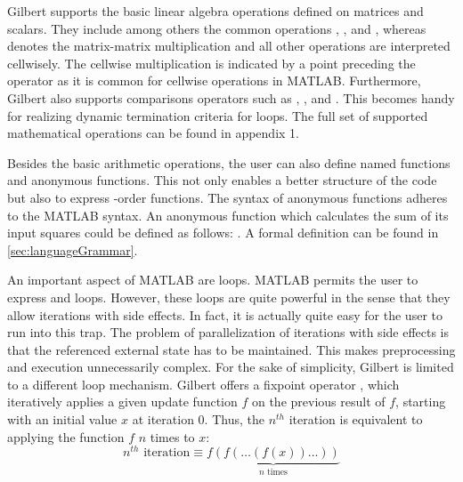Gilbert supports the basic linear algebra operations defined on matrices and scalars.
They include among others the common operations \code{+}, \code{-}, \code{/} and \code{*}, whereas \code{*} denotes the matrix-matrix multiplication and all other operations are interpreted cellwisely.
The cellwise multiplication is indicated by a point preceding the operator as it is common for cellwise operations in MATLAB.
Furthermore, Gilbert also supports comparisons operators such as \code{>}, \code{>=}, \code{==} and \code{\textasciitilde=}.
This becomes handy for realizing dynamic termination criteria for loops.
The full set of supported mathematical operations can be found in appendix 1.

Besides the basic arithmetic operations, the user can also define named functions and anonymous functions.
This not only enables a better structure of the code but also to express -order functions.
The syntax of anonymous functions adheres to the MATLAB syntax.
An anonymous function which calculates the sum of its input squares could be defined as follows: .
A formal definition can be found in \cref{sec:languageGrammar}.

An important aspect of MATLAB are loops.
MATLAB permits the user to express  and  loops.
However, these loops are quite powerful in the sense that they allow iterations with side effects.
In fact, it is actually quite easy for the user to run into this trap.
The problem of parallelization of iterations with side effects is that the referenced external state has to be maintained.
This makes preprocessing and execution unnecessarily complex.
For the sake of simplicity, Gilbert is limited to a different loop mechanism.
Gilbert offers a fixpoint operator , which iteratively applies a given update function $f$ on the previous result of $f$, starting with an initial value $x$ at iteration $0$.
Thus, the $n^{th}$ iteration is equivalent to applying the function $f$ $n$ times to $x$: 
\begin{displaymath}
	n^{th}\text{ iteration}\equiv\underbrace{f(f(\ldots(f(x))\ldots))}_{\text{$n$ times}}
\end{displaymath}

